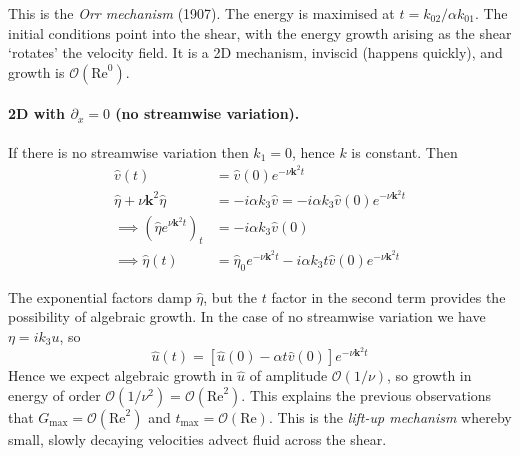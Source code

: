 \documentclass{jknotes}
\newcommand{\ReN}{\text{Re}}
\renewcommand{\k}{\symbf{k}}
\begin{document}
This is the \emph{Orr mechanism} (1907). The energy is maximised at $t=
k_{02}/\alpha k_{01}$. The initial conditions point into the shear, with the
energy growth arising as the shear `rotates' the velocity field. It is a 2D
mechanism, inviscid (happens quickly), and growth is $\mathcal{O}(\ReN^0)$.

\paragraph{2D with $\partial_x = 0$ (no streamwise variation).}
If there is no streamwise variation then $k_1 = 0$, hence $k$ is constant.
Then
\begin{align}
	\hat{v}(t) &= \hat{v}(0) e^{-\nu \k^2 t} \\
	\hat{\eta} + \nu \k^2 \hat{\eta} &= -i\alpha k_3 \hat{v} = -i\alpha k_3
	\hat{v}(0) e^{-\nu \k^2 t} \\
	\implies \left(\hat{\eta}e^{\nu \k^2 t}\right)_t &= -i\alpha k_3
	\hat{v}(0) \\
	\implies \hat{\eta}(t) &= \hat{\eta}_0 e^{-\nu \k^2 t} - i\alpha k_3 t
	\hat{v}(0) e^{-\nu \k^2 t}
\end{align}

The exponential factors damp $\hat{\eta}$, but the $t$ factor in the second
term provides the possibility of algebraic growth. In the case of no
streamwise variation we have $\eta = i k_3 u$, so
\begin{equation}
	\hat{u}(t) = \left[ \hat{u}(0) - \alpha t \hat{v}(0)\right] e^{-\nu \k^2
	t}
\end{equation}
Hence we expect algebraic growth in $\hat{u}$ of amplitude
$\mathcal{O}(1/\nu)$, so growth in energy of order $\mathcal{O}(1/\nu^2) =
\mathcal{O}(\ReN^2)$. This explains the previous observations that $G_{\max}
= \mathcal{O}(\ReN^2)$ and $t_{\max} = \mathcal{O}(\ReN)$. This is the
\emph{lift-up mechanism} whereby small, slowly decaying velocities advect
fluid across the shear.

\begin{center}
\end{center}
\end{document}
